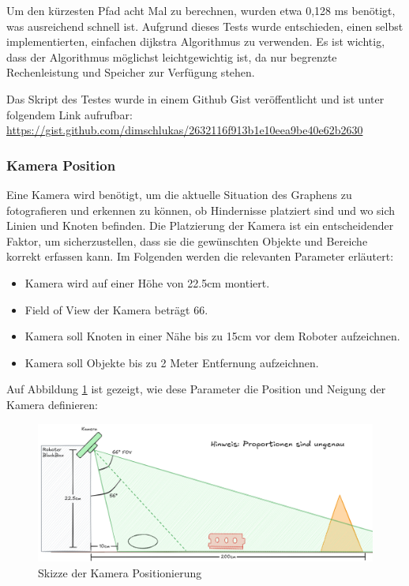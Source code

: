 Um den kürzesten Pfad acht Mal zu berechnen, wurden etwa 0,128 ms benötigt, was ausreichend schnell ist. Aufgrund dieses Tests wurde entschieden, einen selbst implementierten, einfachen \gls{dijkstra} Algorithmus zu verwenden. Es ist wichtig, dass der Algorithmus möglichst leichtgewichtig ist, da nur begrenzte Rechenleistung und Speicher zur Verfügung stehen.

Das Skript des Testes wurde in einem Github Gist veröffentlicht und ist unter folgendem Link aufrufbar: \url{https://gist.github.com/dimschlukas/2632116f913b1e10eea9be40e62b2630}

\subsubsection*{Kamera Position}\label{camera-position}

Eine Kamera wird benötigt, um die aktuelle Situation des Graphens zu fotografieren und erkennen zu können, ob Hindernisse platziert sind und wo sich Linien und Knoten befinden. Die Platzierung der Kamera ist ein entscheidender Faktor, um sicherzustellen, dass sie die gewünschten Objekte und Bereiche korrekt erfassen kann. Im Folgenden werden die relevanten Parameter erläutert:

\begin{itemize}
    \item Kamera wird auf einer Höhe von 22.5cm montiert.
    \item Field of View der Kamera beträgt 66\textdegree.
    \item Kamera soll Knoten in einer Nähe bis zu 15cm vor dem Roboter aufzeichnen.
    \item Kamera soll Objekte bis zu 2 Meter Entfernung aufzeichnen.
\end{itemize}

Auf Abbildung \ref{fig:camera-position} ist gezeigt, wie dese Parameter die Position und Neigung der Kamera definieren:

\begin{figure}[H]
    \centering
    \includegraphics[width=1\linewidth]{assets/informatik-prototyp/camera/camera_position.png}
    \caption{Skizze der Kamera Positionierung}
    \label{fig:camera-position}
\end{figure}

